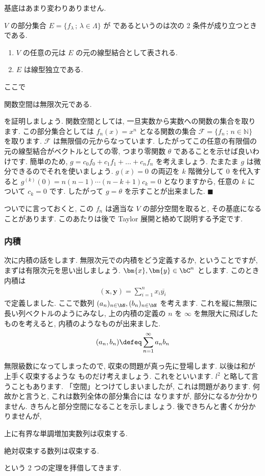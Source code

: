 \documentclass[openany, a4paper, oneside]{jsbook}
\begin{document}
基底はあまり変わりありません.
\begin{defn} $V$ の部分集合 $E=\{ f_{\lambda}\, ; \, \lambda \in \Lambda \}$ が
であるというのは次の 2 条件が成り立つときである.
\begin{enumerate}
\item  $V$ の任意の元は $E$ の元の線型結合として表される.
\item  $E$ は線型独立である.
\end{enumerate}
\end{defn}

ここで
\begin{thm}
 関数空間は無限次元である.
\end{thm}
を証明しましょう.
関数空間としては, 一旦実数から実数への関数の集合を取ります. この部分集合としては $f_n (x) = x^n$ となる関数の集合
 $\mathcal{F}= \{ f_n \, ; \, n \in \mathbb{N} \}$ を取ります.
 $\mathcal{F}$ は無限個の元からなっています. したがってこの任意の有限個の元の線型結合がベクトルとしての零,
つまり零関数 $\theta$ であることを示せば良いわけです. 簡単のため,  $g=c_{0}f_{0}+c_{1}f_{1}+ \dots + c_{n}f_{n}$ を考えましょう.
たまたま $g$ は微分できるのでそれを使いましょう.
 $g (x)=0$ の両辺を $k$ 階微分して $0$ を代入すると
 $g^{(k)}(0)=n (n-1) \dotsb (n-k+1) c_k=0$ となりますから, 任意の $k$ について $c_k=0$ です.
したがって $g=\theta$ を示すことが出来ました.  $\blacksquare$

ついでに言っておくと, この $f_n$ は適当な $V$ の部分空間を取ると, その基底になることがあります.
このあたりは後で Taylor 展開と絡めて説明する予定です.
\subsubsection{内積}

次に内積の話をします. 無限次元での内積をどう定義するか, ということですが, まずは有限次元を思い出しましょう.
 $\bm{x},\bm{y} \in \bC^n$ とします. このとき内積は
\begin{align}
    (\bm{x},\bm{y} ) = \sum_{i=1}^n x_i \overline{y_i}
\end{align}
で定義しました. ここで数列 $(a_n)_{n \in \bN},(b_n)_{n \in \bN}$ を考えます.
これを縦に無限に長い列ベクトルのようにみなし, 上の内積の定義の $n$ を $\infty$ を無限大に飛ばしたものを考えると,
内積のようなものが出来ました.
\begin{align}
    (a_n, b_n ) \defeq \sum _{n=1}^{\infty}a_n b_n
\end{align}

無限級数になってしまったので, 収束の問題が真っ先に登場します. 以後は和が上手く収束するような
ものだけ考えましょう. これをといいます.  $l^2$ と略して言うこともあります.
「空間」とつけてしまいましたが, これは問題があります. 何故かと言うと, これは数列全体の部分集合には
なりますが, 部分になるか分かりません. きちんと部分空間になることを示しましょう.
後できちんと書くか分かりませんが,
\begin{thm}
 上に有界な単調増加実数列は収束する.
\end{thm}
\begin{thm}
 絶対収束する数列は収束する.
\end{thm}
という 2 つの定理を拝借してきます.
\end{document}
